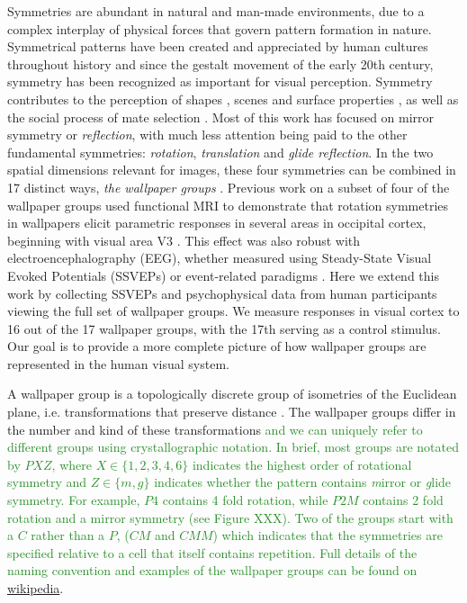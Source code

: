 \documentclass[11pt, twoside]{article}
\begin{document}
Symmetries are abundant in natural and man-made environments, due to a complex interplay of physical forces that govern pattern formation in nature. Symmetrical patterns have been created and appreciated by human cultures throughout history and since the gestalt movement of the early 20th century, symmetry has been recognized as important for visual perception. Symmetry contributes to the perception of shapes \citep{RN1311,RN1682}, scenes \citep{RN1824} and surface properties \citep{RN1166}, as well as the social process of mate selection \citep{RN1337}. Most of this work has focused on mirror symmetry or \textit{reflection}, with much less attention being paid to the other fundamental symmetries: \textit{rotation}, \textit{translation} and \textit{glide reflection}. In the two spatial dimensions relevant for images, these four symmetries can be combined in 17 distinct ways, \textit{the wallpaper groups} \citep{RN1562,RN1563,RN1425}. Previous work on a subset of four of the wallpaper groups used functional MRI to demonstrate that rotation symmetries in wallpapers elicit parametric responses in several areas in occipital cortex, beginning with visual area V3 \citep{RN1725}. This effect was also robust with electroencephalography (EEG), whether measured using Steady-State Visual Evoked Potentials (SSVEPs)\citep{RN1725} or event-related paradigms \citep{RN1959}. Here we extend this work by collecting SSVEPs and psychophysical data from human participants viewing the full set of wallpaper groups. We measure responses in visual cortex to 16 out of the 17 wallpaper groups, with the 17th serving as a control stimulus. Our goal is to provide a more complete picture of how wallpaper groups are represented in the human visual system.

A wallpaper group is a topologically discrete group of isometries of the Euclidean plane, i.e. transformations that preserve distance \citep{RN1425}. The wallpaper groups differ in the number and kind of these transformations \textcolor{ForestGreen}{and we can uniquely refer to different groups using crystallographic notation. In brief, most groups are notated by $PXZ$, where $X\in\{1,2,3,4,6\}$ indicates the highest order of rotational symmetry and $Z\in\{m, g\}$ indicates whether the pattern contains \textit{m}irror or \textit{g}lide symmetry. For example, $P4$ contains 4 fold rotation, while $P2M$ contains 2 fold rotation and a mirror symmetry (see Figure XXX). Two of the groups start with a $C$ rather than a $P$, ($CM$ and $CMM$) which indicates that the symmetries are specified relative to a cell that itself contains repetition. Full details of the naming convention and examples of the wallpaper groups can be found on \href{https://en.wikipedia.org/wiki/Wallpaper_group}{wikipedia}}.
\end{document}
